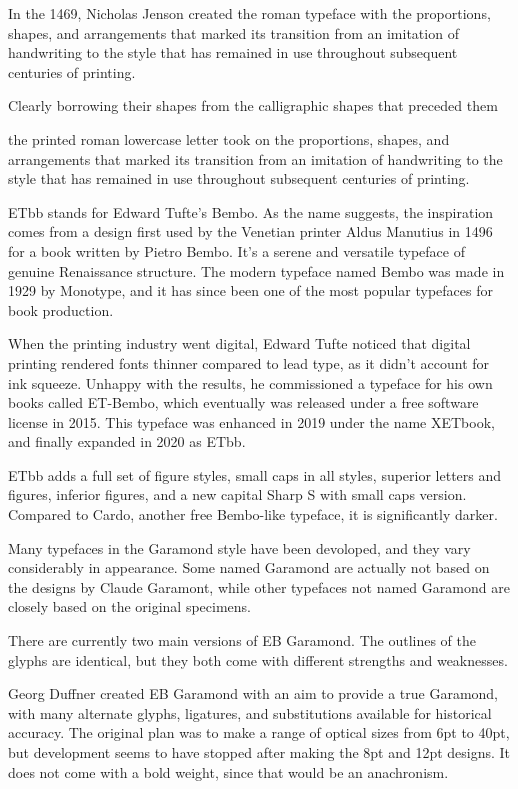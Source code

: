 %
%

In the 1469, Nicholas Jenson created the roman typeface with the proportions, shapes, and arrangements that marked its transition from an imitation of handwriting to the style that has remained in use throughout subsequent centuries of printing.


Clearly borrowing their shapes from the calligraphic shapes that preceded them

the printed roman lowercase letter took on the proportions, shapes, and arrangements that marked its transition from an imitation of handwriting to the style that has remained in use throughout subsequent centuries of printing.  

%
%

ETbb stands for Edward Tufte’s Bembo. As the name suggests, the inspiration comes from a design first used by the Venetian printer Aldus Manutius in 1496 for a book written by Pietro Bembo. It’s a serene and versatile typeface of genuine Renaissance structure. The modern typeface named Bembo was made in 1929 by Monotype, and it has since been one of the most popular typefaces for book production.

When the printing industry went digital, Edward Tufte noticed that digital printing rendered fonts thinner compared to lead type, as it didn’t account for ink squeeze. Unhappy with the results, he commissioned a typeface for his own books called ET-Bembo, which eventually was released under a free software license in 2015. This typeface was enhanced in 2019 under the name XETbook, and finally expanded in 2020 as ETbb.

ETbb adds a full set of figure styles, small caps in all styles, superior letters and figures, inferior figures, and a new capital Sharp S with small caps version. Compared to Cardo, another free Bembo-like typeface, it is significantly darker.

%
%

Many typefaces in the Garamond style have been devoloped, and they vary considerably in appearance. Some named Garamond are actually not based on the designs by Claude Garamont, while other typefaces not named Garamond are closely based on the original specimens.

There are currently two main versions of EB Garamond. The outlines of the glyphs are identical, but they both come with different strengths and weaknesses.

Georg Duffner created EB Garamond with an aim to provide a true Garamond, with many alternate glyphs, ligatures, and substitutions available for historical accuracy. The original plan was to make a range of optical sizes from 6pt to 40pt, but development seems to have stopped after making the 8pt and 12pt designs. It does not come with a bold weight, since that would be an anachronism. 

